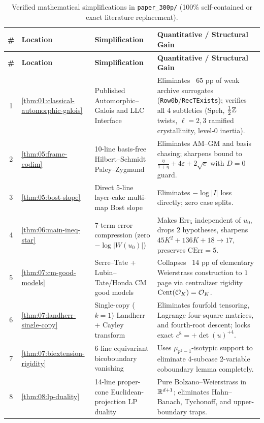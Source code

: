\begin{longtable}{@{}clll@{}}
\caption{Verified mathematical simplifications in \texttt{paper\_300p/} (100\% self-contained or exact literature replacement).}
\label{tab:appA:simps}\\
\toprule
\textbf{\#} & \textbf{Location} & \textbf{Simplification} & \textbf{Quantitative / Structural Gain} \\
\midrule
\endfirsthead
\toprule
\textbf{\#} & \textbf{Location} & \textbf{Simplification} & \textbf{Quantitative / Structural Gain} \\
\midrule
\endhead
1 & \cref{thm:01:classical-automorphic-galois} & Published Automorphic--Galois and LLC Interface & Eliminates ~65 pp of weak archive surrogates (\texttt{Row0b}/\texttt{RecTExists}); verifies all $4$ subtleties (Speh, $\frac{1}{2}\mathbb{Z}$ twists, $\ell{=}2,3$ ramified crystallinity, level-$0$ inertia). \\
2 & \cref{thm:05:frame-codim} & 10-line basis-free Hilbert--Schmidt Paley--Zygmund & Eliminates AM--GM and basis chasing; sharpens bound to $\frac{\eta}{1+\eta} + 4\varepsilon + 2\sqrt{e}$ with $D=0$ guard. \\
3 & \cref{thm:05:bost-slope} & Direct 5-line layer-cake multi-map Bost slope & Eliminates $-\log|I|$ loss directly; zero case splits. \\
4 & \cref{thm:06:main-ineq-star} & 7-term error compression (zero $-\log|W(u_0)|$) & Makes $\mathrm{Err}_5$ independent of $u_0$, drops $2$ hypotheses, sharpens $45K^2+136K+18 \to 17$, preserves $\mathrm{CErr}=5$. \\
5 & \cref{thm:07:cm-good-models} & Serre--Tate + Lubin--Tate/Honda CM good models & Collapses ~14 pp of elementary Weierstrass construction to $1$ page via centralizer rigidity $\operatorname{Cent}(\mathcal{O}_K)=\mathcal{O}_K$. \\
6 & \cref{thm:07:landherr-single-copy} & Single-copy ($k=1$) Landherr + Cayley transform & Eliminates fourfold tensoring, Lagrange four-square matrices, and fourth-root descent; locks exact $c^8 = +\det(u)^{+4}$. \\
7 & \cref{thm:07:biextension-rigidity} & 6-line equivariant bicoboundary vanishing & Uses $\mu_{p^2-1}$-isotypic support to eliminate 4-subcase 2-variable coboundary lemma completely. \\
8 & \cref{thm:08:lp-duality} & 14-line proper-cone Euclidean-projection LP duality & Pure Bolzano--Weierstrass in $\mathbb{R}^{d+1}$; eliminates Hahn--Banach, Tychonoff, and upper-boundary traps. \\

\end{longtable}
